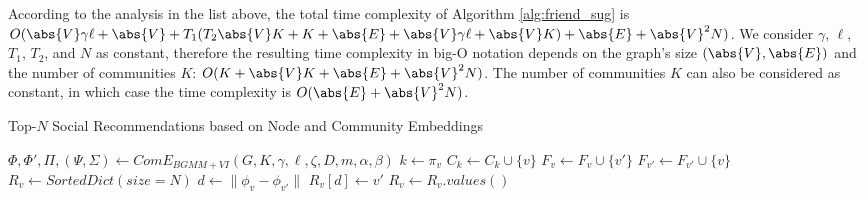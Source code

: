 \documentclass[conference]{IEEEtran}
\begin{document}
According to the analysis in the list above, the total time complexity of Algorithm \ref{alg:friend_sug} is $O(\abs{V}\gamma\ell + \abs{V} + T_1 (T_2\abs{V}K + K + \abs{E} + \abs{V}\gamma\ell + \abs{V}K) + \abs{E} + \abs{V}^2N)$. We consider $\gamma$, $\ell$, $T_1$, $T_2$, and $N$ as constant, therefore the resulting time complexity in big-O notation depends on the graph's size $(\abs{V}, \abs{E})$ and the number of communities $K$: $O(K + \abs{V}K + \abs{E} + \abs{V}^2N)$. The number of communities $K$ can also be considered as constant, in which case the time complexity is $O(\abs{E} + \abs{V}^2N)$.

\begin{algorithm}[H]
    \caption{Top-$N$ Social Recommendations based on Node and Community Embeddings}
    \label{alg:friend_sug_com}
    \begin{algorithmic}[1]
        \State $\Phi, \Phi', \Pi, (\Psi,\Sigma) \leftarrow ComE_{BGMM+VI}(G, K, \gamma, \ell, \zeta, D, m, \alpha, \beta)$ 
         
        \State $k \leftarrow \pi_v$
        \State $C_k \leftarrow C_k \cup \{v\}$
        \EndFor
         
        \State $F_v \leftarrow F_v \cup \{v'\}$
        \State $F_{v'} \leftarrow F_{v'} \cup \{v\}$
        \EndFor
        \State $R_v \leftarrow SortedDict(size=N)$ 
         
        \State $d \leftarrow \|\phi_v - \phi_{v'}\|$ 
        \State $R_v[d] \leftarrow v'$ 
        \EndFor
        \State $R_v  \leftarrow R_v.values()$ 
        \EndFor
    \end{algorithmic}
\end{algorithm}
\end{document}
